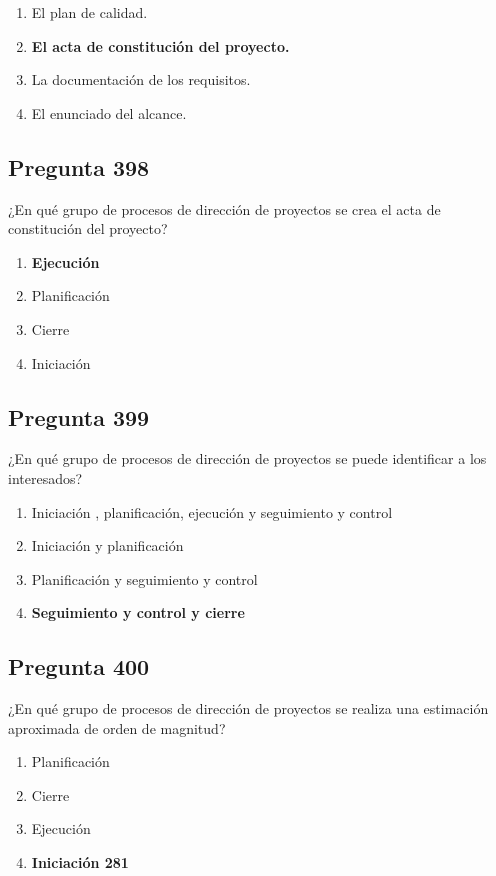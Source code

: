 \documentclass[11pt,a4paper]{article}
\begin{document}
\begin{enumerate}[label=\alph*)]
  \item El plan de calidad.
  \item \textbf{El acta de constitución del proyecto.}
  \item La documentación de los requisitos.
  \item El enunciado del alcance.
\end{enumerate}

\subsection*{Pregunta 398}
¿En qué grupo de procesos de dirección de proyectos se crea el acta de constitución del proyecto?

\begin{enumerate}[label=\alph*)]
  \item \textbf{Ejecución}
  \item Planificación
  \item Cierre
  \item Iniciación
\end{enumerate}

\subsection*{Pregunta 399}
¿En qué grupo de procesos de dirección de proyectos se puede identificar a los interesados?

\begin{enumerate}[label=\alph*)]
  \item Iniciación , planificación, ejecución y seguimiento y control
  \item Iniciación y planificación
  \item Planificación y seguimiento y control
  \item \textbf{Seguimiento y control y cierre}
\end{enumerate}

\subsection*{Pregunta 400}
¿En qué grupo de procesos de dirección de proyectos se realiza una estimación aproximada de orden de magnitud?

\begin{enumerate}[label=\alph*)]
  \item Planificación
  \item Cierre
  \item Ejecución
  \item \textbf{Iniciación 281}
\end{enumerate}
\end{document}
